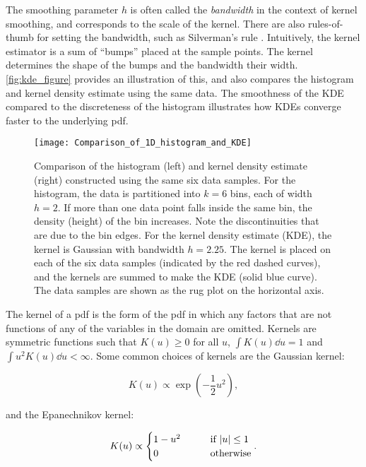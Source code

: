The smoothing parameter $h$ is often called the \textit{bandwidth} in the context of kernel smoothing, and corresponds to the scale of the kernel. There are also rules-of-thumb for setting the bandwidth, such as Silverman's rule \cite{silverman_rule}. Intuitively, the kernel estimator is a sum of “bumps” placed at the sample points. The kernel determines the shape of the bumps and the bandwidth their width. \autoref{fig:kde_figure} provides an illustration of this, and also compares the histogram and kernel density estimate using the same data. The smoothness of the KDE compared to the discreteness of the histogram illustrates how KDEs converge faster to the underlying pdf.

\begin{figure}[!htb]
    \centering
    \texttt{[image: Comparison\_of\_1D\_histogram\_and\_KDE]}
    \caption{Comparison of the histogram (left) and kernel density estimate (right) constructed using the same six data samples. For the histogram, the data is partitioned into $k=6$ bins, each of width $h=2$. If more than one data point falls inside the same bin, the density (height) of the bin increases. Note the discontinuities that are due to the bin edges. For the kernel density estimate (KDE), the kernel is Gaussian with bandwidth $h=2.25$. The kernel is placed on each of the six data samples (indicated by the red dashed curves), and the kernels are summed to make the KDE (solid blue curve). The data samples are shown as the rug plot on the horizontal axis.
    }
    \label{fig:kde_figure}
\end{figure}


The kernel of a pdf is the form of the pdf in which any factors that are not functions of any of the variables in the domain are omitted. Kernels are symmetric functions such that $K(u) \geq 0$ for all $u$, $\int K(u) \dd{u}=1$ and $\int u^2 K(u) \dd{u} < \infty$. Some common choices of kernels are the Gaussian kernel:

\begin{equation}\label{eq:gaussian_kernel}
    K(u) \propto \exp(-\frac{1}{2} u^2),
\end{equation}

and the Epanechnikov kernel:

\begin{equation}\label{eq:epkov_kernel}
    K (u) \propto \begin{cases} 
    1 - u^2 \qquad &\text{if } \abs{u} \leq 1 
    \\
    0 \qquad &\text{otherwise}
    \end{cases}.
\end{equation}

